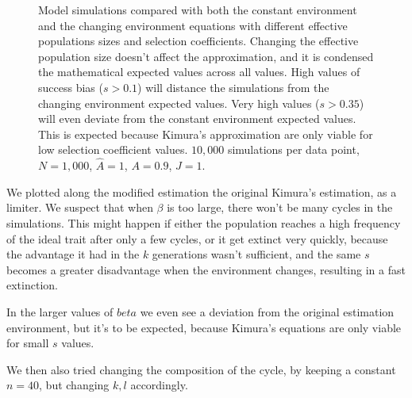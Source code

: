 \documentclass[12pt]{extarticle}
\begin{document}
\begin{figure}[t]
\begin{center}
\begin{subfigure}[a]{0.49\linewidth}
   \end{subfigure}
  \end{center}
  \caption{Model simulations compared with both the constant environment and the changing environment equations with different effective populations sizes and selection coefficients. Changing the effective population size doesn't affect the approximation, and it is condensed the mathematical expected values across all values. High values of success bias ($s>0.1$) will distance the simulations from the changing environment expected values. Very high values ($s>0.35$) will even deviate from the constant environment expected values. This is expected because Kimura's approximation are only viable for low selection coefficient values.
  $10,000$ simulations per data point, $N=1,000$, $\hat{A}=1$, $A=0.9$, $J=1$.}
  \label{fig:ch_env_alpha_beta}
\end{figure}

We plotted along the modified estimation the original Kimura's estimation, as a limiter. We suspect that when $\beta$ is too large, there won't be many cycles in the simulations. This might happen if either the population reaches a high frequency of the ideal trait after only a few cycles, or it get extinct very quickly, because the advantage it had in the $k$ generations wasn't sufficient, and the same $s$ becomes a greater disadvantage when the environment changes, resulting in a fast extinction.

In the larger values of $beta$ we even see a deviation from the original estimation environment, but it's to be expected, because Kimura's equations are only viable for small $s$ values.

We then also tried changing the composition of the cycle, by keeping a constant $n=40$, but changing $k,l$ accordingly.
\end{document}
